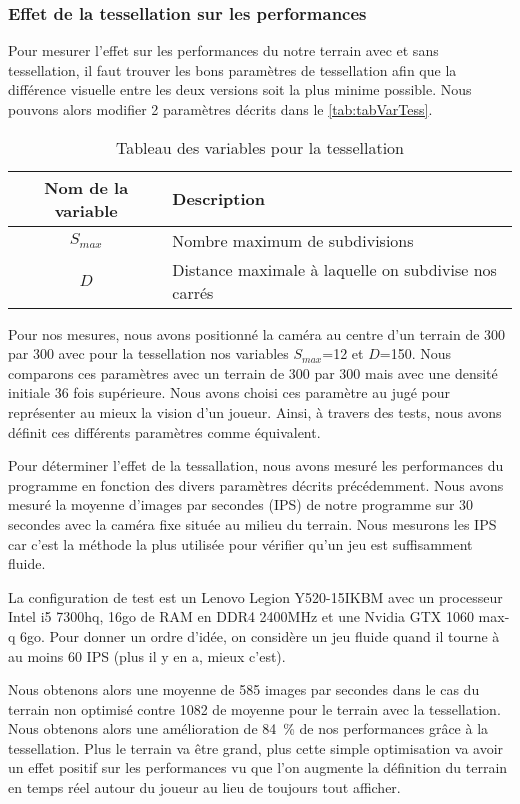 \subsubsection{Effet de la tessellation sur les performances}

Pour mesurer l'effet sur les performances du notre terrain avec et sans tessellation, il faut trouver les bons paramètres de tessellation afin que la différence visuelle entre les deux versions soit la plus minime possible. Nous pouvons alors modifier 2 paramètres décrits dans le \autoref{tab:tabVarTess}. 



\begin{table}[H]
	\centering
	\begin{tabular}{|c|l|}
		\hline
		\textbf{Nom de la variable} & \textbf{Description}  \\
		\hline
		$S_{max}$ & Nombre maximum de subdivisions\\
		$D$ & Distance maximale à laquelle on subdivise nos carrés\\
		\hline
	\end{tabular}
	\caption{Tableau des variables pour la tessellation}
	\label{tab:tabVarTess}
\end{table}

Pour nos mesures, nous avons positionné la caméra au centre d'un terrain de 300 par 300 avec pour la tessellation nos variables $S_{max}$=12 et $D$=150. Nous comparons ces paramètres avec un terrain de 300 par 300 mais avec une densité initiale 36 fois supérieure. Nous avons choisi ces paramètre au jugé pour représenter au mieux la vision d'un joueur. Ainsi, à travers des tests, nous avons définit ces différents paramètres comme équivalent.

Pour déterminer l'effet de la tessallation, nous avons mesuré les performances du programme en fonction des divers paramètres décrits précédemment. Nous avons mesuré la moyenne d'images par secondes (IPS) de notre programme sur 30 secondes avec la caméra fixe située au milieu du terrain. Nous mesurons les IPS car c'est la méthode la plus utilisée pour vérifier qu'un jeu est suffisamment fluide.

La configuration de test est un Lenovo Legion Y520-15IKBM avec un processeur Intel i5 7300hq, 16go de RAM en DDR4 2400MHz et une Nvidia GTX 1060 max-q 6go. Pour donner un ordre d'idée, on considère un jeu fluide quand il tourne à au moins 60 IPS (plus il y en a, mieux c'est).


Nous obtenons alors une moyenne de 585 images par secondes dans le cas du terrain non optimisé contre 1082 de moyenne pour le terrain avec la tessellation. Nous obtenons alors une amélioration de 84~\% de nos performances grâce à la tessellation. Plus le terrain va être grand, plus cette simple optimisation va avoir un effet positif sur les performances vu que l'on augmente la définition du terrain en temps réel autour du joueur au lieu de toujours tout afficher.


